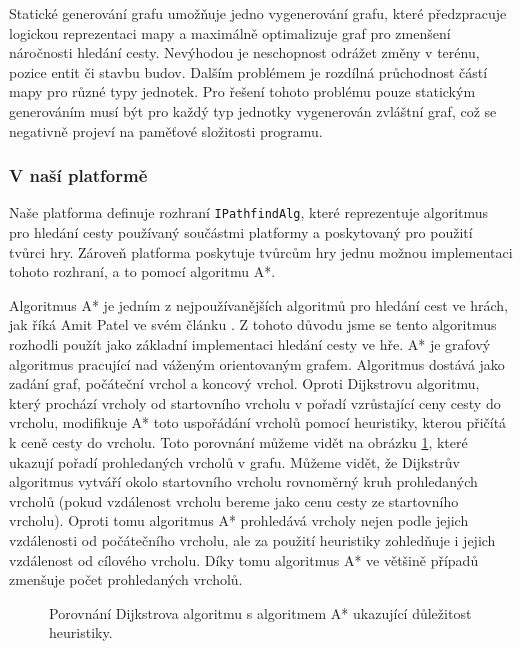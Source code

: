 Statické generování grafu umožňuje jedno vygenerování grafu, které předzpracuje logickou reprezentaci mapy a maximálně optimalizuje graf pro zmenšení náročnosti hledání cesty. Nevýhodou je neschopnost odrážet změny v terénu, pozice entit či stavbu budov. Dalším problémem je rozdílná průchodnost částí mapy pro různé typy jednotek. Pro řešení tohoto problému pouze statickým generováním musí být pro každý typ jednotky vygenerován zvláštní graf, což se negativně projeví na paměťové složitosti programu.

\subsubsection{V naší platformě}
Naše platforma definuje rozhraní \texttt{IPathfindAlg}, které reprezentuje algoritmus pro hledání cesty používaný součástmi platformy a poskytovaný pro použití tvůrci hry. Zároveň platforma poskytuje tvůrcům hry jednu možnou implementaci tohoto rozhraní, a to pomocí algoritmu A*.

Algoritmus A* je jedním z nejpoužívanějších algoritmů pro hledání cest ve hrách, jak říká Amit Patel ve svém článku \citep{site:introastar}. Z tohoto důvodu jsme se tento algoritmus rozhodli použít jako základní implementaci hledání cesty ve hře. A* je grafový algoritmus pracující nad váženým orientovaným grafem. Algoritmus dostává jako zadání graf, počáteční vrchol a koncový vrchol. Oproti Dijkstrovu algoritmu, který prochází vrcholy od startovního vrcholu v pořadí vzrůstající ceny cesty do vrcholu, modifikuje A* toto uspořádání vrcholů pomocí heuristiky, kterou přičítá k ceně cesty do vrcholu. Toto porovnání můžeme vidět na obrázku \ref{fig:astardijkstra}, které ukazují pořadí prohledaných vrcholů v grafu. Můžeme vidět, že Dijkstrův algoritmus vytváří okolo startovního vrcholu rovnoměrný kruh prohledaných vrcholů (pokud vzdálenost vrcholu bereme jako cenu cesty ze startovního vrcholu). Oproti tomu algoritmus A* prohledává vrcholy nejen podle jejich vzdálenosti od počátečního vrcholu, ale za použití heuristiky zohledňuje i jejich vzdálenost od cílového vrcholu. Díky tomu algoritmus A* ve většině případů zmenšuje počet prohledaných vrcholů.

\begin{figure}[h]
	\centering
	\hfill
	\caption{Porovnání Dijkstrova algoritmu s algoritmem A* ukazující důležitost heuristiky.}
	\label{fig:astardijkstra}
\end{figure}

